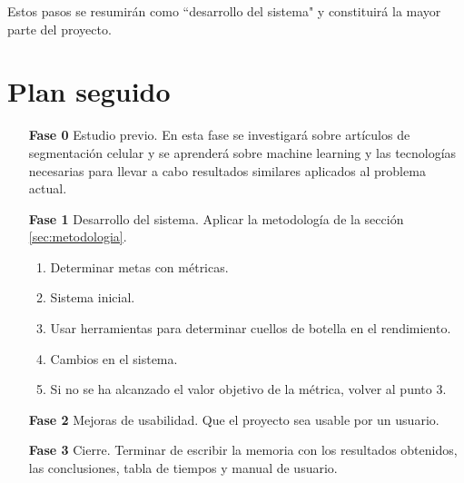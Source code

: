 Estos pasos se resumirán como ``desarrollo del sistema" y constituirá la mayor parte del proyecto.
\newpage
\section{Plan seguido}\label{sec:planactualizado}

\begin{itemize}
\item[\textbf{Fase 0}] Estudio previo. En esta fase se investigará sobre artículos de segmentación celular y se aprenderá sobre machine learning y las tecnologías necesarias para llevar a cabo resultados similares aplicados al problema actual.
\item[\textbf{Fase 1}] Desarrollo del sistema. Aplicar la metodología de la sección \ref{sec:metodologia}.
\begin{enumerate}
\item Determinar metas con métricas.
\item Sistema inicial.
\item Usar herramientas para determinar cuellos de botella en el rendimiento.
\item Cambios en el sistema.
\item Si no se ha alcanzado el valor objetivo de la métrica, volver al punto 3.
\end{enumerate}
\item[\textbf{Fase 2}] Mejoras de usabilidad. Que el proyecto sea usable por un usuario.
\item[\textbf{Fase 3}] Cierre. Terminar de escribir la memoria con los resultados obtenidos, las conclusiones, tabla de tiempos y manual de usuario.
\end{itemize}
